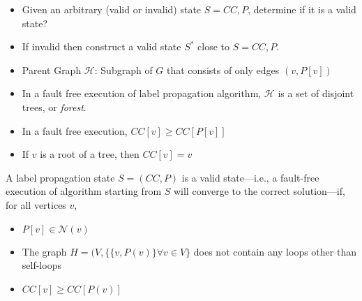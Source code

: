 
\begin{itemize}
\item Given an arbitrary (valid or invalid) state $S={CC,P}$, determine if it is a valid state? 
\item If invalid then construct a valid state $S^{*}$ close to $S={CC,P}$.
\end{itemize}

\lyxframeend{}





\begin{itemize}
\item Parent Graph $\mathcal{H}$: Subgraph  of $G$ that consists of only edges $(v,P[v])$
\end{itemize}

\lyxframeend{}



\begin{itemize}
\item In a fault free execution of label propagation algorithm,  $\mathcal{H}$ is a set of disjoint trees, or \emph{forest}.
\end{itemize}

\lyxframeend{}




\begin{itemize}
\item In a fault free execution, $CC[v]\geq CC[P[v]]$ 
\item If $v$ is a root of a tree, then  $CC[v] = v$ 
\end{itemize}

\lyxframeend{}



\begin{theorem}

A label propagation state $S=(CC,P)$ is a valid state---i.e.,
a fault-free execution of algorithm  starting from $S$ will converge to the correct solution---if, for all vertices $v$, 

\begin{itemize}
\item $P[v] \in \mathcal{N}(v)$
\item The graph $H=(V, \{\{v,P(v)\}\forall v \in V\} $ does not contain any loops other than self-loops
\item $CC[v] \geq CC[P(v)] $
\end{itemize}

\end{theorem}


